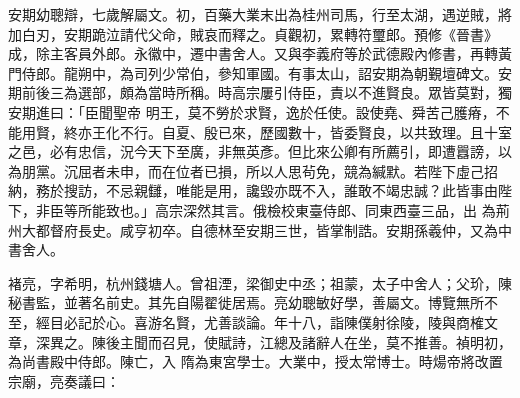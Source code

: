\begin{pinyinscope}
 安期幼聰辯，七歲解屬文。初，百藥大業末出為桂州司馬，行至太湖，遇逆賊，將加白刃，安期跪泣請代父命，賊哀而釋之。貞觀初，累轉符璽郎。預修《晉書》成，除主客員外郎。永徽中，遷中書舍人。又與李義府等於武德殿內修書，再轉黃門侍郎。龍朔中，為司列少常伯，參知軍國。有事太山，詔安期為朝覲壇碑文。安期前後三為選部，頗為當時所稱。時高宗屢引侍臣，責以不進賢良。眾皆莫對，獨安期進曰：「臣聞聖帝
 明王，莫不勞於求賢，逸於任使。設使堯、舜苦己臒瘠，不能用賢，終亦王化不行。自夏、殷已來，歷國數十，皆委賢良，以共致理。且十室之邑，必有忠信，況今天下至廣，非無英彥。但比來公卿有所薦引，即遭囂謗，以為朋黨。沉屈者未申，而在位者已損，所以人思茍免，競為緘默。若陛下虛己招納，務於搜訪，不忌親讎，唯能是用，讒毀亦既不入，誰敢不竭忠誠？此皆事由陛下，非臣等所能致也。」高宗深然其言。俄檢校東臺侍郎、同東西臺三品，出
 為荊州大都督府長史。咸亨初卒。自德林至安期三世，皆掌制誥。安期孫羲仲，又為中書舍人。



 褚亮，字希明，杭州錢塘人。曾祖湮，梁御史中丞；祖蒙，太子中舍人；父玠，陳秘書監，並著名前史。其先自陽翟徙居焉。亮幼聰敏好學，善屬文。博覽無所不至，經目必記於心。喜游名賢，尤善談論。年十八，詣陳僕射徐陵，陵與商榷文章，深異之。陳後主聞而召見，使賦詩，江總及諸辭人在坐，莫不推善。禎明初，為尚書殿中侍郎。陳亡，入
 隋為東宮學士。大業中，授太常博士。時煬帝將改置宗廟，亮奏議曰：




\end{pinyinscope}

